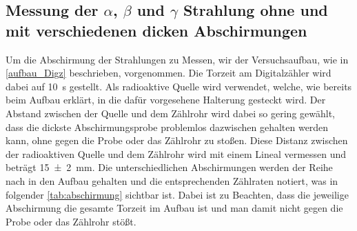 \documentclass[12pt,english,ngerman]{scrartcl}
\begin{document}
\subsection{Messung der \texorpdfstring{$\alpha$}{alpha}, \texorpdfstring{$\beta$}{beta} und
	\texorpdfstring{$\gamma$}{gamma} Strahlung ohne und mit verschiedenen dicken Abschirmungen}

Um die Abschirmung der Strahlungen zu Messen, wir der Versuchsaufbau, wie in
\autoref{aufbau_Digz} beschrieben, vorgenommen. Die Torzeit am Digitalzähler
wird dabei auf \SI{10}{\second} gestellt. Als radioaktive Quelle wird
 verwendet, welche, wie bereits beim Aufbau erklärt, in die
dafür vorgesehene Halterung gesteckt wird. Der Abstand zwischen der Quelle und
dem Zählrohr wird dabei so gering gewählt, dass die dickste Abschirmungsprobe
problemlos dazwischen gehalten werden kann, ohne gegen die Probe oder das
Zählrohr zu stoßen. Diese Distanz zwischen der radioaktiven Quelle und dem
Zählrohr wird mit einem Lineal vermessen und beträgt \SI{15(2)}{\mm}. Die
unterschiedlichen Abschirmungen werden der Reihe nach in den Aufbau gehalten
und die entsprechenden Zählraten notiert, was in folgender
\autoref{tab:abschirmung} sichtbar ist. Dabei ist zu Beachten, dass die
jeweilige Abschirmung die gesamte Torzeit im Aufbau ist und man damit nicht
gegen die Probe oder das Zählrohr stößt.

\begin{table}[H]
	\caption[Erhaltene Zählraten bei verschiedenen Abschirmungsmaterialien]{
		Erhaltene
		Zählraten bei verschiedenen Abschirmungsmaterialien bei einer Torzeit von
		\SI{10}{\second} und einem Abstand der radioaktiven Quelle von \SI{15(2)}{\mm}.
		Zählraten sind exakt.                                                                                                              \\
		\(z_{Luft} \dots\) erhaltene Zählrate ohne Abschirmung                                                                             \\
		\(z_{\mathrm{Papier}} \dots\) erhaltene Zählrate mit einem Blatt Papier als Abschirmung                                    \\
		\(z_{\mathrm{Lineal}} \dots\) erhaltene Zählrate mit einem Lineal als Abschirmung, Dicke = \SI{2.1(0.05)}{\mm}             \\
		\(z_{\mathrm{CD}} \dots\) erhaltene Zählrate mit einer CD und zugehörigen Soulcase als Abschirmung                     \\
		\(z_{\mathrm{Alu \num{0.4}}} \dots\) erhaltene Zählrate mit mit einem Aluminiumblech als Abschirmung, Dicke = \SI{0.4(0.05)}{\mm} \\
		\(z_{\mathrm{Alu \num{0.8}}} \dots\) erhaltene Zählrate mit mit einem Aluminiumblech als Abschirmung, Dicke = \SI{0.8(0.05)}{\mm} \\
		\(z_{\mathrm{Alu \num{4}}} \dots\) erhaltene Zählrate mit mit einem Aluminiumblech als Abschirmung, Dicke = \SI{4.0(0.05)}{\mm} \\
	}
	\label{tab:abschirmung}
	\begin{center}
		
	\end{center}
\end{table}
\end{document}
